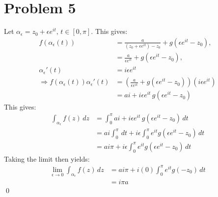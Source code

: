 \documentclass[a4paper, titlepage, DIV=14]{scrartcl}
\begin{document}
    \section*{Problem 5}
    Let $\alpha_{\epsilon} = z_{0} + \epsilon e^{it}, \, t\in[0,\pi]$. This gives:
    \begin{align*}
        f(\alpha_{\epsilon}(t)) &= \frac{a}{(z_{0} +\epsilon e^{it}) - z_{0}} + g(\epsilon e^{it} - z_{0}), \\
            &= \frac{a}{\epsilon e^{it}} + g(\epsilon e^{it} - z_{0}), \\
        \alpha_{\epsilon}'(t) &= i\epsilon e^{it} \\
        \Rightarrow f(\alpha_{\epsilon}(t))\alpha_{\epsilon}'(t) &= (\frac{a}{\epsilon e^{it}} + g(\epsilon e^{it} - z_{0}))(i\epsilon e^{it}) \\
        &= ai + i\epsilon e^{it} \, g(\epsilon e^{it} - z_{0})
    \end{align*}
    This gives:
    \begin{align*}
        \int_{\alpha_{\epsilon}} f(z) \, dz &= \int_{0}^{\pi} ai + i\epsilon e^{it} \, g(\epsilon e^{it} - z_{0}) \, dt \\
            &= ai \int_{0}^{\pi}\, dt + i\epsilon \int_{0}^{\pi}e^{it}g(\epsilon e^{it} - z_{0}) \, dt \\
            &= ai\pi + i\epsilon \int_{0}^{\pi}e^{it}g(\epsilon e^{it} - z_{0}) \, dt 
    \end{align*}
    Taking the limit then yields:
    \begin{align*}
        \lim_{\epsilon \to 0}\int_{\alpha_{\epsilon}} f(z) \, dz &= ai\pi + i(0) \int_{0}^{\pi}e^{it}g(- z_{0}) \, dt \\
            &= i\pi a 
    \end{align*} \qed
    
\end{document}
